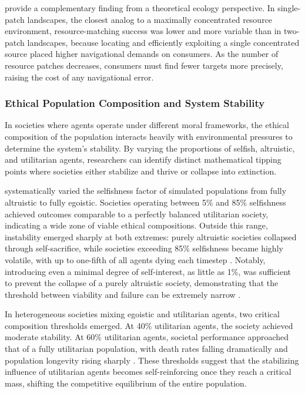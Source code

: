 \documentclass{icsthesis}
\begin{document}
\begin{mainmatter}
\citet{Fagan2022} provide a complementary finding from a theoretical ecology perspective. In single-patch landscapes, the closest analog to a maximally concentrated resource environment, resource-matching success was lower and more variable than in two-patch landscapes, because locating and efficiently exploiting a single concentrated source placed higher navigational demands on consumers. As the number of resource patches decreases, consumers must find fewer targets more precisely, raising the cost of any navigational error.

\subsubsection{Ethical Population Composition and System Stability}
In societies where agents operate under different moral frameworks, the ethical composition of the population interacts heavily with environmental pressures to determine the system's stability. By varying the proportions of selfish, altruistic, and utilitarian agents, researchers can identify distinct mathematical tipping points where societies either stabilize and thrive or collapse into extinction.

\citet{KremerHerman2024} systematically varied the selfishness factor of simulated populations from fully altruistic to fully egoistic. Societies operating between 5\% and 85\% selfishness achieved outcomes comparable to a perfectly balanced utilitarian society, indicating a wide zone of viable ethical compositions. Outside this range, instability emerged sharply at both extremes: purely altruistic societies collapsed through self-sacrifice, while societies exceeding 85\% selfishness became highly volatile, with up to one-fifth of all agents dying each timestep \citep{KremerHerman2024}. Notably, introducing even a minimal degree of self-interest, as little as 1\%, was sufficient to prevent the collapse of a purely altruistic society, demonstrating that the threshold between viability and failure can be extremely narrow \citep{KremerHerman2024}.

In heterogeneous societies mixing egoistic and utilitarian agents, two critical composition thresholds emerged. At 40\% utilitarian agents, the society achieved moderate stability. At 60\% utilitarian agents, societal performance approached that of a fully utilitarian population, with death rates falling dramatically and population longevity rising sharply \citep{KremerHerman2024}. These thresholds suggest that the stabilizing influence of utilitarian agents becomes self-reinforcing once they reach a critical mass, shifting the competitive equilibrium of the entire population.


\end{mainmatter}
\end{document}
